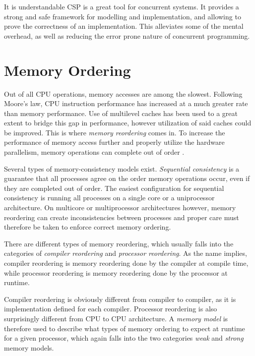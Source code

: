 It is understandable CSP is a great tool for concurrent systems. It provides a strong and safe framework for modelling and implementation, and allowing to prove the correctness of an implementation. This alleviates some of the mental overhead, as well as reducing the error prone nature of concurrent programming. 


\section{Memory Ordering}
\label{sec:memory_ordering}


Out of all CPU operations, memory accesses are among the slowest. Following Moore's law, CPU instruction performance has increased at a much greater rate than memory performance. Use of multilevel caches has been used to a great extent to bridge this gap in performance, however utilization of said caches could be improved. This is where \textit{memory reordering} comes in. To increase the performance of memory access further and properly utilize the hardware parallelism, memory operations can complete out of order \citep{mckenney2007memory}.

Several types of memory\hyp{}consistency models exist. \textit{Sequential consistency} is a guarantee that all processes agree on the order memory operations occur, even if they are completed out of order. The easiest configuration for sequential consistency is running all processes on a single core or a uniprocessor architecture. On multicore or multiprocessor architectures however, memory reordering can create inconsistencies between processes and proper care must therefore be taken to enforce correct memory ordering. 

There are different types of memory reordering, which usually falls into the categories of \textit{compiler reordering} and \textit{processor reordering}. As the name implies, compiler reordering is memory reordering done by the compiler at compile time, while processor reordering is memory reordering done by the processor at runtime.

Compiler reordering is obviously different from compiler to compiler, as it is implementation defined for each compiler. Processor reordering is also surprisingly different from CPU to CPU architecture. A \textit{memory model} is therefore used to describe what types of memory ordering to expect at runtime for a given processor, which again falls into the two categories \textit{weak} and \textit{strong} memory models.

